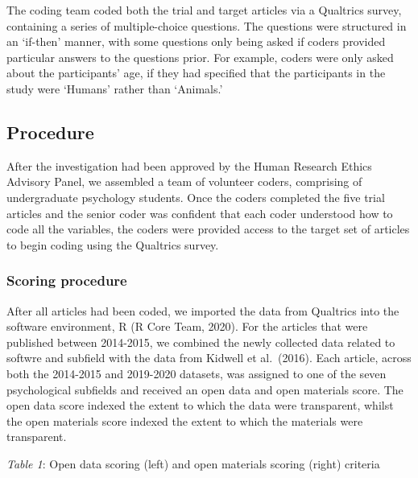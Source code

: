 \documentclass[
  english,
  man,floatsintext]{apa6}
\begin{document}
The coding team coded both the trial and target articles via a Qualtrics survey, containing a series of multiple-choice questions. The questions were structured in an `if-then' manner, with some questions only being asked if coders provided particular answers to the questions prior. For example, coders were only asked about the participants' age, if they had specified that the participants in the study were `Humans' rather than `Animals.'

\hypertarget{procedure}{%
\subsection{Procedure}\label{procedure}}

After the investigation had been approved by the Human Research Ethics Advisory Panel, we assembled a team of volunteer coders, comprising of undergraduate psychology students. Once the coders completed the five trial articles and the senior coder was confident that each coder understood how to code all the variables, the coders were provided access to the target set of articles to begin coding using the Qualtrics survey.

\hypertarget{scoring-procedure}{%
\subsubsection{Scoring procedure}\label{scoring-procedure}}

After all articles had been coded, we imported the data from Qualtrics into the software environment, R (R Core Team, 2020). For the articles that were published between 2014-2015, we combined the newly collected data related to softwre and subfield with the data from Kidwell et al.~(2016). Each article, across both the 2014-2015 and 2019-2020 datasets, was assigned to one of the seven psychological subfields and received an open data and open materials score. The open data score indexed the extent to which the data were transparent, whilst the open materials score indexed the extent to which the materials were transparent.

\emph{Table 1}: Open data scoring (left) and open materials scoring (right) criteria
\end{document}
